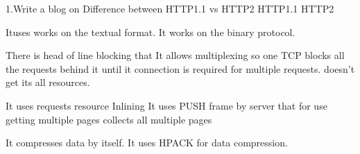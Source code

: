 1.Write a blog on Difference between HTTP1.1 vs HTTP2
	HTTP1.1										HTTP2

	Ituses works on the textual format.	    It works on the binary protocol.
		
	There is head of line blocking that  		It allows multiplexing so one TCP  
	blocks all the requests behind it until it	connection is required for multiple requests.
	doesn’t get its all resources.	
	
	It uses requests resource Inlining			It uses PUSH frame by server that
	for use getting multiple pages				collects all multiple pages
	
	It compresses data by itself.				It uses HPACK for data compression.
